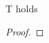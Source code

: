 \documentclass{amsart}
\begin{document}
\begin{theorem}
T holds
\end{theorem}

\begin{proof}
\end{proof}
\end{document}
